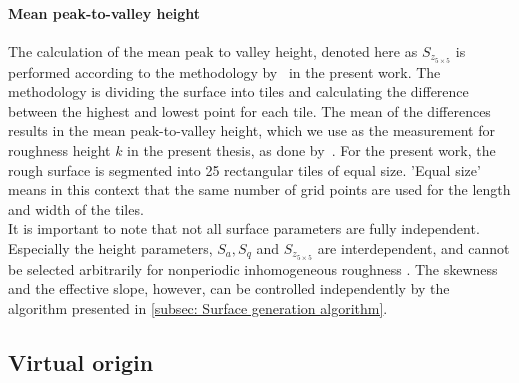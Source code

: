 \paragraph{Mean peak-to-valley height}
The calculation of the mean peak to valley height, denoted here as $S_{z_{5\times 5}}$ is performed according to the methodology by~\cite{thakkarInvestigationTurbulentFlow2017} in the present work.
The methodology is dividing the surface into tiles and calculating the difference between the highest and lowest point for each tile.
The mean of the differences results in  the mean peak-to-valley height, which we use as the measurement for roughness height $k$ in the present thesis, as done by~\cite{demaioDirectNumericalSimulation2023}.
For the present work, the rough surface is segmented into 25 rectangular tiles of equal size.
'Equal size' means in this context that the same number of grid points are used for the length and width of the tiles.
\\
It is important to note that not all surface parameters are fully independent.
Especially the height parameters, $S_a, S_q$ and $S_{z_{5\times 5}}$ are interdependent, and cannot be selected arbitrarily for nonperiodic inhomogeneous roughness \citep{perez-rafolsGeneratingRandomlyRough2019}.
The skewness and the effective slope, however, can be controlled independently by the algorithm presented in \autoref{subsec: Surface generation algorithm}.


\subsection{Virtual origin}\label{subsec: Virtual origin}

